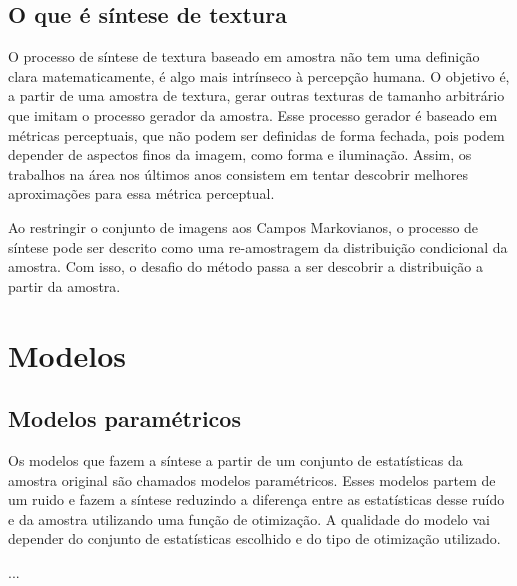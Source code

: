 
 

\section{O que é síntese de textura}


O processo de síntese de textura baseado
em amostra não tem uma definição clara
matematicamente, é algo mais intrínseco
à percepção humana. O objetivo é,
a partir de uma amostra de textura,
gerar outras texturas de tamanho
arbitrário que imitam o processo
gerador da amostra. Esse processo
gerador é baseado em métricas
perceptuais, que não podem ser
definidas de forma fechada, pois
podem depender de aspectos
finos da imagem, como forma e 
iluminação.
Assim, os trabalhos na área
nos últimos anos consistem em
tentar descobrir melhores aproximações
para essa métrica perceptual.



Ao restringir o conjunto de imagens aos
Campos Markovianos, o processo de síntese
pode ser descrito como uma re-amostragem
da distribuição condicional da amostra.
Com isso, o desafio do método passa a ser 
descobrir a distribuição a partir
da amostra.


\chapter{Modelos}

\section{Modelos paramétricos}

Os modelos que fazem a síntese a partir
de um conjunto de estatísticas da amostra
original são chamados modelos paramétricos.
Esses modelos partem de um ruido e fazem
a síntese reduzindo
a diferença entre as estatísticas desse
ruído e da amostra utilizando uma função de 
otimização.
A qualidade do modelo vai depender do
conjunto de estatísticas escolhido
e do tipo de otimização utilizado.

...


